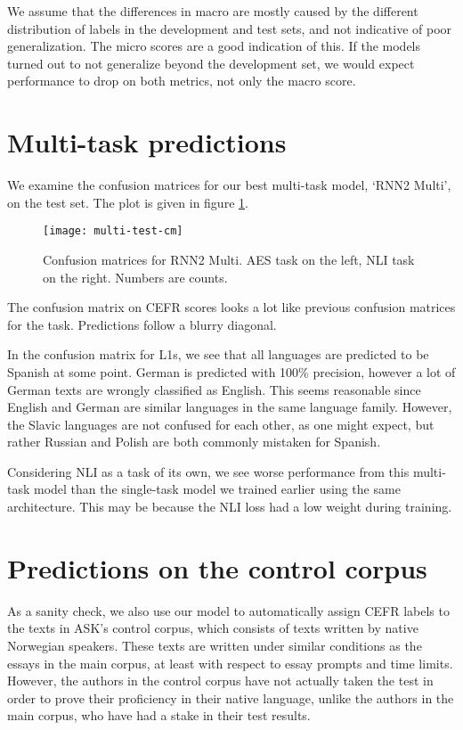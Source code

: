 We assume that the differences in macro \FI are mostly caused by the
different distribution of labels in the development and test sets, and not
indicative of poor generalization. The micro \FI scores are a good indication
of this. If the models turned out to not generalize beyond the development
set, we would expect performance to drop on both metrics, not only the macro
\FI score.


\section{Multi-task predictions}

We examine the confusion matrices for our best multi-task model, `RNN2 Multi',
on the test set. The plot is given in figure \ref{fig:multi-test-cm}.

\begin{figure}[]
  \centering
  \texttt{[image: multi-test-cm]}
  
  \caption[Multi-task confusion matrices]{
    Confusion matrices for RNN2 Multi. \ac{AES} task on the left, \ac{NLI}
    task on the right. Numbers are counts.
  }
  \label{fig:multi-test-cm}
\end{figure}

The confusion matrix on CEFR scores looks a lot like previous confusion matrices
for the task. Predictions follow a blurry diagonal.

In the confusion matrix for \acp{L1}, we see that all languages are predicted
to be Spanish at some point. German is predicted with 100\% precision,
however a lot of German texts are wrongly classified as English. This seems
reasonable since English and German are similar languages in the same
language family. However, the Slavic languages are not confused for each
other, as one might expect, but rather Russian and Polish are both commonly
mistaken for Spanish.

Considering \ac{NLI} as a task of its own, we see worse performance from this
multi-task model than the single-task model we trained earlier 
using the same architecture.  This may be because the NLI loss
had a low weight during training.


\section{Predictions on the control corpus}

As a sanity check, we also use our model to automatically assign CEFR labels
to the texts in ASK's control corpus, which consists of texts written by
native Norwegian speakers. These texts are written under similar conditions as
the essays in the main corpus, at least with respect to essay prompts and time
limits. However, the authors in the control corpus have not actually taken the
test in order to prove their proficiency in their native language, unlike the
authors in the main corpus, who have had a stake in their test results.

